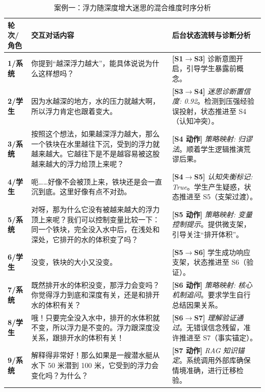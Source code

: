 \begin{table}[htbp]
    \centering
    \caption{案例一：浮力随深度增大迷思的混合维度时序分析}
    \label{tab:case1-timeline}
    \begin{tabular}{p{1.5cm}p{7.5cm}p{5.5cm}}
        \toprule
        \textbf{轮次/角色} & \textbf{交互对话内容} & \textbf{后台状态流转与诊断分析} \\
        \midrule
        \textbf{1/系统} & 你提到“越深浮力越大”，能具体说说为什么这样想吗？ & \textbf{[S1$\rightarrow$S3]} 诊断意图开启，引导学生暴露前概念。 \\
        \midrule
        \textbf{2/学生} & 因为水越深的地方，水的压力就越大啊，所以浮力肯定也跟着变大。 & \textbf{[S3$\rightarrow$S4]} \textit{迷思诊断置信度: 0.92}。检测到压强经验误投射，状态推进至 S4（认知冲突）。 \\
        \midrule
        \textbf{3/系统} & 按照这个想法，如果越深浮力越大，那么一个铁块在水里越往下沉，受到的浮力就越来越大。它越往下是不是越容易被这股越来越大的浮力给顶上来呢？ & \textbf{[S4 动作]} \textit{策略映射: 归谬法}。顺着学生逻辑推演荒谬后果。 \\
        \midrule
        \textbf{4/学生} & 呃……好像不会被顶上来，铁块还是会一直沉到底。这里好像有点不对劲。 & \textbf{[S4$\rightarrow$S5]} \textit{认知失衡标记: True}。学生产生疑惑，状态推进至 S5（支架过渡）。 \\
        \midrule
        \textbf{5/系统} & 对呀，那为什么它没有被越来越大的浮力顶上来呢？我们可以控制变量比较一下：同一个铁块，完全没入水中后，在浅处和深处，它排开的水的体积变了吗？ & \textbf{[S5 动作]} \textit{策略映射: 变量控制提示}。提供微支架，引导关注“排开体积”。 \\
        \midrule
        \textbf{6/学生} & 没变，铁块的大小又没变。 & \textbf{[S5$\rightarrow$S6]} 学生成功响应支架，状态推进至 S6（验证）。 \\
        \midrule
        \textbf{7/系统} & 既然排开水的体积没变，那浮力会变吗？你觉得浮力到底和深度有关，还是和排开水的体积有关？ & \textbf{[S6 动作]} \textit{策略映射: 核心机制追问}。要求学生自行总结因果关系。 \\
        \midrule
        \textbf{8/学生} & 哦！只要完全没入水中，排开的水体积就不变，所以浮力是不变的。浮力跟深度没关系，跟排开水的体积有关！ & \textbf{[S6$\rightarrow$S7]} \textit{理解验证通过}。无错误信念残留，准许推进至 S7（事实锚定）。 \\
        \midrule
        \textbf{9/系统} & 解释得非常好！那么如果是一艘潜水艇从水下 50 米潜到 100 米，它受到的浮力会变化吗？为什么？ & \textbf{[S7 动作]} \textit{RAG 知识锚定}。系统调用外部库确保情境准确，进行迁移检验。 \\
        \bottomrule
    \end{tabular}
\end{table}

